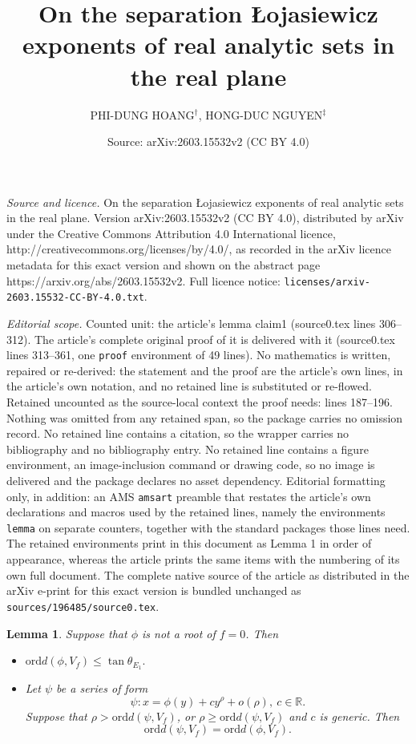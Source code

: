 \documentclass[10pt,a4paper]{amsart}
\title{On the separation \L ojasiewicz exponents of real analytic sets in the real plane}
\author{PHI-D{U}NG HO{A}NG$^\dag$, HONG-DUC NGUYEN$^\ddag$}
\date{Source: arXiv:2603.15532v2 (CC BY 4.0)}
\newtheorem{lemma}{Lemma}
\begin{document}
\maketitle

\noindent\emph{Source and licence.} On the separation \L ojasiewicz exponents of real analytic sets in the real plane. Version arXiv:2603.15532v2 (CC BY 4.0), distributed by arXiv under the Creative Commons Attribution 4.0 International licence, http://creativecommons.org/licenses/by/4.0/, as recorded in the arXiv licence metadata for this exact version and shown on the abstract page https://arxiv.org/abs/2603.15532v2. Full licence notice: \texttt{licenses/arxiv-2603.15532-CC-BY-4.0.txt}.\par\smallskip

\noindent\textit{Editorial scope.} Counted unit: the article's lemma claim1 (source0.tex lines 306--312). The article's complete original proof of it is delivered with it (source0.tex lines 313--361, one \texttt{proof} environment of 49 lines). No mathematics is written, repaired or re-derived: the statement and the proof are the article's own lines, in the article's own notation, and no retained line is substituted or re-flowed.  Retained uncounted as the source-local context the proof needs: lines 187--196.  Nothing was omitted from any retained span, so the package carries no omission record.  No retained line contains a citation, so the wrapper carries no bibliography and no bibliography entry.  No retained line contains a figure environment, an image-inclusion command or drawing code, so no image is delivered and the package declares no asset dependency.  Editorial formatting only, in addition: an AMS \texttt{amsart} preamble that restates the article's own declarations and macros used by the retained lines, namely the environments \texttt{lemma} on separate counters, together with the standard packages those lines need.  The retained environments print in this document as Lemma 1 in order of appearance, whereas the article prints the same items with the numbering of its own full document.  The complete native source of the article as distributed in the arXiv e-print for this exact version is bundled unchanged as \texttt{sources/196485/source0.tex}.
\begin{lemma}\label{distant-sliding}
Suppose that $\phi$ is not a root of $f = 0$. Then
	\begin{itemize}
		\item[(i)] $\mathrm{ord}d(\phi, V_f)\leq \tan \theta_{E_1}.$		
		\item[(ii)] Let $\psi$ be a series of form
	$$\psi : x = \phi(y) + c y^{\rho} + o(\rho),\ c \in \mathbb{R}.$$
Suppose that $\rho>\mathrm{ord}d(\psi, V_f)$, or $\rho\geq \mathrm{ord}d(\psi, V_f)$ and $c$ is generic. Then
		$$\mathrm{ord}d(\psi, V_f)= \mathrm{ord}d(\phi, V_f).$$
	\end{itemize}
\end{lemma}
\end{document}
